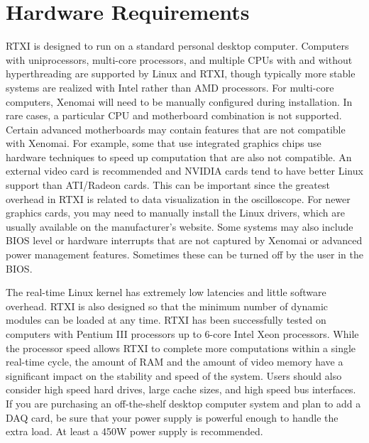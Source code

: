 \section{Hardware Requirements}

 
RTXI is designed to run on a standard personal desktop computer. Computers with uniprocessors, multi-core processors, and multiple CPUs with and without hyperthreading are supported by Linux and RTXI, though typically more stable systems are realized with Intel rather than AMD processors. For multi-core computers, Xenomai will need to be manually configured during installation. In rare cases, a particular CPU and motherboard combination is not supported. Certain advanced motherboards may contain features that are not compatible with Xenomai. For example, some that use integrated graphics chips use hardware techniques to speed up computation that are also not compatible. An external video card is recommended and NVIDIA cards tend to have better Linux support than ATI/Radeon cards. This can be important since the greatest overhead in RTXI is related to data visualization in the oscilloscope. For newer graphics cards, you may need to manually install the Linux drivers, which are usually available on the manufacturer's website. Some systems may also include BIOS level or hardware interrupts that are not captured by Xenomai or advanced power management features. Sometimes these can be turned off by the user in the BIOS.

The real-time Linux kernel has extremely low latencies and little software overhead. RTXI is also designed so that the minimum number of dynamic modules can be loaded at any time. RTXI has been successfully tested on computers with Pentium III processors up to 6-core Intel Xeon processors. While the processor speed allows RTXI to complete more computations within a single real-time cycle, the amount of RAM and the amount of video memory have a significant impact on the stability and speed of the system. Users should also consider high speed hard drives, large cache sizes, and high speed bus interfaces. If you are purchasing an off-the-shelf desktop computer system and plan to add a DAQ card, be sure that your power supply is powerful enough to handle the extra load. At least a 450W power supply is recommended.